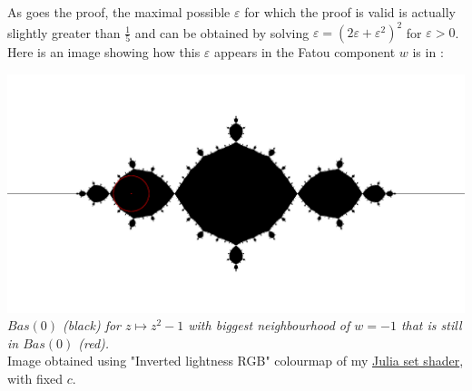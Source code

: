\documentclass{article}
\begin{document}
As goes the proof, the maximal possible $\varepsilon$ for which the proof is valid is actually slightly greater than $\frac{1}{5}$ and can be obtained by solving $\varepsilon = (2 \varepsilon + \varepsilon^2)^2$ for $\varepsilon > 0$. Here is an image showing how this $\varepsilon$ appears in the Fatou component $w$ is in : \\
\begin{center}
\includegraphics[scale=0.3]{20231028105914}
\textit{$Bas(0)$ (black) for $z \mapsto z^2-1$ with biggest neighbourhood of $w = -1$ that is still in $Bas(0)$ (red).} \\
Image obtained using "Inverted lightness RGB" colourmap of my \textcolor{blue}{\underline{\href{https://github.com/ChrisMzz/pyogl-shader-tester/blob/main/shaders/frag_incriter.glsl}{Julia set shader}}}, with fixed $c$.
\end{center}




\end{document}
